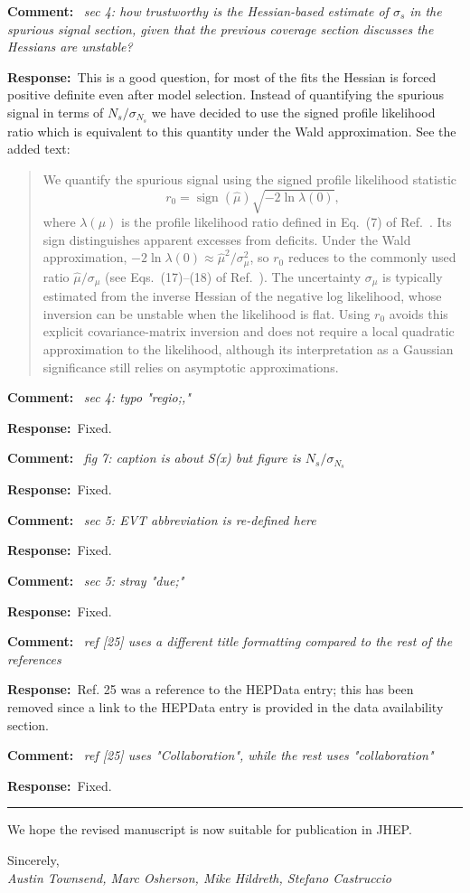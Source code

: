 \documentclass[11pt,a4paper]{article}
\newcommand{\refcomment}[1]{%
    \medskip\noindent\textbf{\color{refcolor}Comment:}\ %
    {\itshape #1}\par\smallskip
}
\newcommand{\response}{\noindent\textbf{Response:}\ }
\newcommand{\addedtext}[1]{%
    \smallskip\begin{quote}\color{quotecolor}\small #1\end{quote}\smallskip
}
\begin{document}
\refcomment{sec 4: how trustworthy is the Hessian-based estimate of $\sigma_s$ in the spurious signal section, given that the previous coverage section discusses the Hessians are unstable?}
\response This is a good question, for most of the fits the Hessian is forced positive definite even after model selection. Instead of quantifying the spurious signal in terms of $N_s/\sigma_{N_s}$ we have decided to use the signed profile likelihood ratio which is equivalent to this quantity under the Wald approximation. See the added text:
\addedtext{We quantify the spurious signal using the signed profile likelihood statistic
\begin{equation}
r_0 = \operatorname{sign}(\hat{\mu})\sqrt{-2\ln\lambda(0)},
\end{equation}
where $\lambda(\mu)$ is the profile likelihood ratio defined in Eq.~(7) of Ref.~\cite{Cowan_2011}. Its sign distinguishes apparent excesses from deficits. Under the Wald approximation,
$-2\ln\lambda(0)\approx\hat{\mu}^2/\sigma_\mu^2$, so $r_0$ reduces to the commonly used ratio $\hat{\mu}/\sigma_\mu$ (see Eqs.~(17)--(18) of Ref.~\cite{Cowan_2011}). The uncertainty $\sigma_\mu$ is typically estimated from the inverse Hessian of the negative log likelihood, whose inversion can be unstable when the likelihood is flat. Using $r_0$ avoids this explicit covariance-matrix inversion and does not require a local quadratic approximation to the likelihood, although its interpretation as a Gaussian significance still relies on asymptotic approximations.
}

\refcomment{sec 4: typo "regio;,"}
\response Fixed.

\refcomment{fig 7: caption is about S(x) but figure is $N_s/\sigma_{N_s}$}
\response Fixed.

\refcomment{sec 5: EVT abbreviation is re-defined here}
\response Fixed.

\refcomment{sec 5: stray "due;"}
\response Fixed.

\refcomment{ref [25] uses a different title formatting compared to the rest of the references}
\response Ref. 25 was a reference to the HEPData entry; this has been removed since a link to the HEPData entry is provided in the data availability section.

\refcomment{ref [25] uses "Collaboration", while the rest uses "collaboration"}
\response Fixed.

\bigskip
\hrule
\bigskip

\noindent We hope the revised manuscript is now suitable for publication in JHEP.

\bigskip
\noindent Sincerely,\\
\textit{Austin Townsend, Marc Osherson, Mike Hildreth, Stefano Castruccio}
\end{document}

